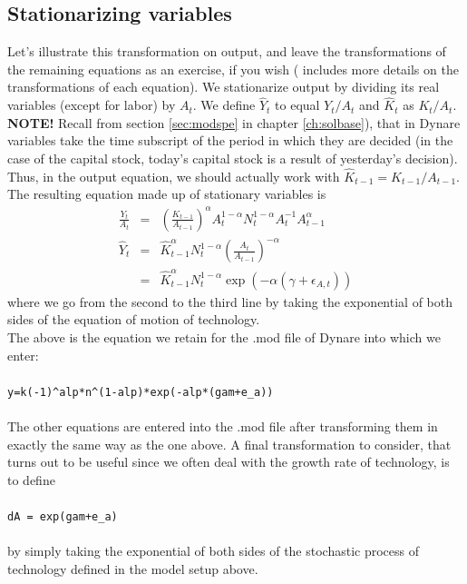 \subsection{Stationarizing variables}
Let's illustrate this transformation on output, and leave the transformations of the remaining equations as an exercise, if you wish (\citet{CogleyNason1994} includes more details on the transformations of each equation). We stationarize output by dividing its real variables (except for labor) by $A_t$. We define $\widehat{Y}_t$ to equal $Y_t / A_t$ and $\widehat{K}_t$ as $K_t / A_t$. \textsf{\textbf{NOTE!}} Recall from section \ref{sec:modspe} in chapter \ref{ch:solbase}), that in Dynare variables take the time subscript of the period in which they are decided (in the case of the capital stock, today's capital stock is a result of yesterday's decision). Thus, in the output equation, we should actually work with $\widehat{K}_{t-1}=K_{t-1} / A_{t-1}$. The resulting equation made up of stationary variables is
\begin{eqnarray*}
\frac{Y_t}{A_t} & = & \left( \frac{K_{t-1}}{A_{t-1}} \right)^\alpha A_t^{1-\alpha} N_t^{1-\alpha} A_t^{-1} A_{t-1}^\alpha \\
\widehat{Y}_t & = & \widehat{K}_{t-1}^\alpha N_t^{1-\alpha} \left( \frac{A_t}{A_{t-1}} \right)^{-\alpha} \\
& = & \widehat{K}_{t-1}^\alpha N_t^{1-\alpha} \exp(-\alpha (\gamma + \epsilon_{A,t}))
\end{eqnarray*}
where we go from the second to the third line by taking the exponential of both sides of the equation of motion of technology.\\

The above is the equation we retain for the .mod file of Dynare into which we enter:\\
\\
\texttt{y=k(-1)\textasciicircum alp*n\textasciicircum (1-alp)*exp(-alp*(gam+e\_a))}\\
\\

The other equations are entered into the .mod file after transforming them in exactly the same way as the one above. A final transformation to consider, that turns out to be useful since we often deal with the growth rate of technology, is to define \\
\\
\texttt{dA = exp(gam+e\_a)}\\
\\
by simply taking the exponential of both sides of the stochastic process of technology defined in the model setup above. \\

